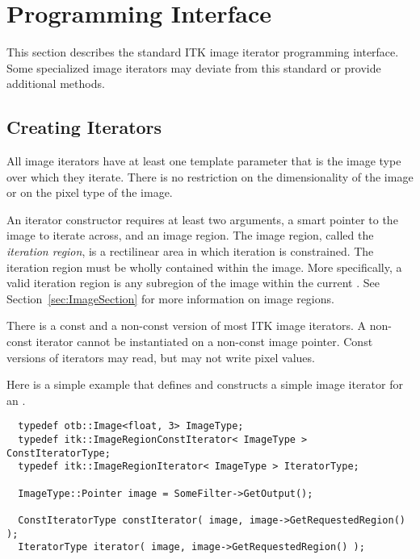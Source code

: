 \section{Programming Interface}
\label{sec:IteratorsInterface}

This section describes the standard ITK image iterator programming interface.
Some specialized image iterators may deviate from this standard or provide
additional methods.

\subsection{Creating Iterators}
\label{sec:CreatingIterators}

All image iterators have at least one template parameter that is the image
type over which they iterate.  There is no restriction on the dimensionality
of the image or on the pixel type of the image.


An iterator constructor requires at least two arguments, a smart pointer to the
image to iterate across, and an image region. The image region, called the
\emph{iteration region}, is a rectilinear area in which iteration is
constrained.  The iteration region must be wholly contained within the image.
More specifically, a valid iteration region is any subregion of the image
within the current .  See Section~\ref{sec:ImageSection}
for more information on image regions.

There is a const and a non-const version of most ITK image iterators. A
non-const iterator cannot be instantiated on a non-const image pointer.
Const versions of iterators may read, but may not write pixel values.

Here is a simple example that defines and constructs a simple image iterator
for an .

\small
\begin{verbatim}
  typedef otb::Image<float, 3> ImageType;
  typedef itk::ImageRegionConstIterator< ImageType > ConstIteratorType;
  typedef itk::ImageRegionIterator< ImageType > IteratorType;

  ImageType::Pointer image = SomeFilter->GetOutput();

  ConstIteratorType constIterator( image, image->GetRequestedRegion() );
  IteratorType iterator( image, image->GetRequestedRegion() );
\end{verbatim}
\normalsize

